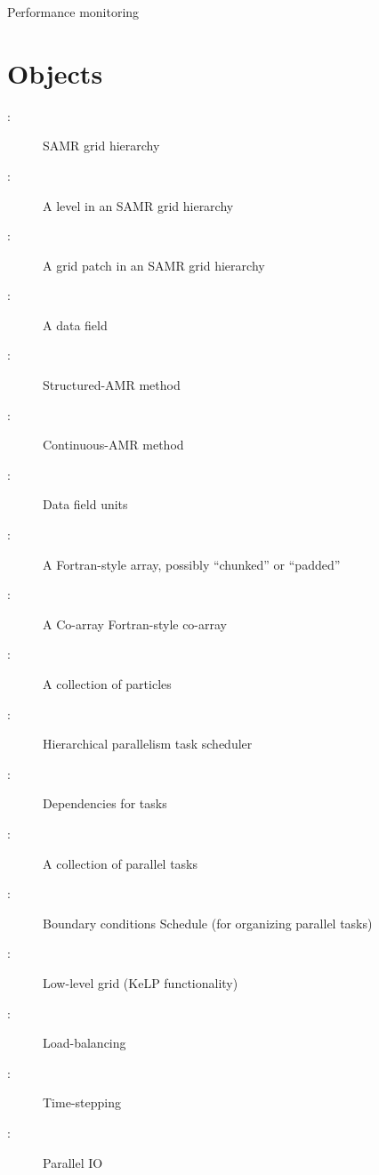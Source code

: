 \documentclass{article}
\begin{document}
Performance monitoring



\section{Objects} \label{s:intro}

\begin{description}
\item[: ] SAMR grid hierarchy
\item[: ]     A level in an SAMR grid hierarchy
\item[: ]      A grid patch in an SAMR grid hierarchy
\item[: ]     A data field
\item[: ]  Structured-AMR method
\item[: ]   Continuous-AMR method
\item[: ]     Data field units
\item[: ]     A Fortran-style array, possibly ``chunked'' or ``padded''
\item[: ]   A Co-array Fortran-style co-array
\item[: ] A collection of particles
\item[: ]  Hierarchical parallelism task scheduler
\item[: ] Dependencies for tasks
\item[: ]     A collection of parallel tasks
\item[: ]        Boundary conditions
      Schedule (for organizing parallel tasks)
\item[: ]       Low-level grid (KeLP functionality)
\item[: ]    Load-balancing
\item[: ] Time-stepping
\item[: ]         Parallel IO
\end{description}

\end{document}
